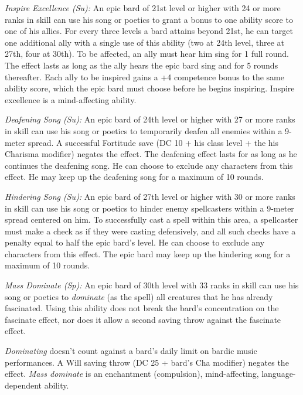 \textit{Inspire Excellence (Su):} An epic bard of 21st level or higher with 24 or more ranks in  skill can use his song or poetics to grant a bonus to one ability score to one of his allies. For every three levels a bard attains beyond 21st, he can target one additional ally with a single use of this ability (two at 24th level, three at 27th, four at 30th). To be affected, an ally must hear him sing for 1 full round. The effect lasts as long as the ally hears the epic bard sing and for 5 rounds thereafter. Each ally to be inspired gains a +4 competence bonus to the same ability score, which the epic bard must choose before he begins inspiring. Inspire excellence is a mind-affecting ability.

\textit{Deafening Song (Su):} An epic bard of 24th level or higher with 27 or more ranks in  skill can use his song or poetics to temporarily deafen all enemies within a 9-meter spread. A successful Fortitude save (DC 10 + \onehalf his class level + the his Charisma modifier) negates the effect. The deafening effect lasts for as long as he continues the deafening song. He can choose to exclude any characters from this effect. He may keep up the deafening song for a maximum of 10 rounds.

\textit{Hindering Song (Su):} An epic bard of 27th level or higher with 30 or more ranks in  skill can use his song or poetics to hinder enemy spellcasters within a 9-meter spread centered on him. To successfully cast a spell within this area, a spellcaster must make a  check as if they were casting defensively, and all such checks have a penalty equal to half the epic bard's level. He can choose to exclude any characters from this effect. The epic bard may keep up the hindering song for a maximum of 10 rounds.

\textit{Mass Dominate (Sp):} An epic bard of 30th level with 33 ranks in  skill can use his song or poetics to \emph{dominate} (as the  spell) all creatures that he has already fascinated. Using this ability does not break the bard's concentration on the fascinate effect, nor does it allow a second saving throw against the fascinate effect.

\emph{Dominating} doesn't count against a bard's daily limit on bardic music performances. A Will saving throw (DC 25 + bard's Cha modifier) negates the effect. \emph{Mass dominate} is an enchantment (compulsion), mind-affecting, language-dependent ability.


